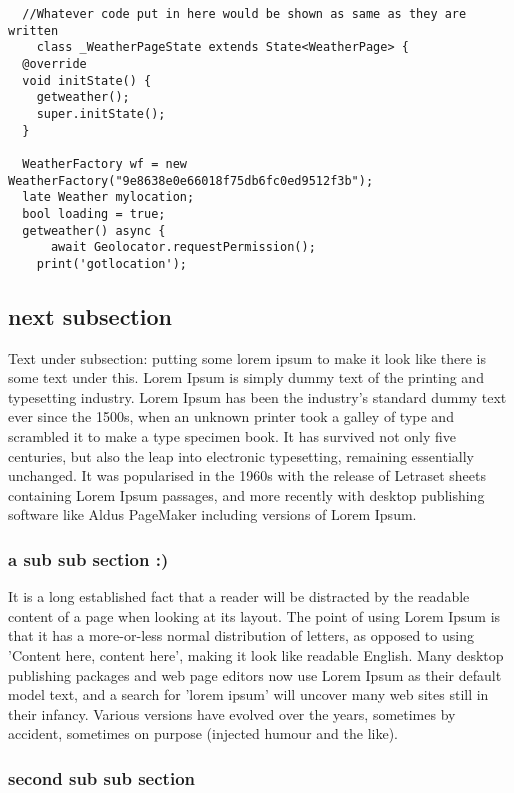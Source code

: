 \documentclass{article}     %
\begin{document}
\begin{verbatim}
  //Whatever code put in here would be shown as same as they are written
    class _WeatherPageState extends State<WeatherPage> {
  @override
  void initState() {
    getweather();
    super.initState();
  }

  WeatherFactory wf = new WeatherFactory("9e8638e0e66018f75db6fc0ed9512f3b");
  late Weather mylocation;
  bool loading = true;
  getweather() async {
      await Geolocator.requestPermission();
    print('gotlocation');
\end{verbatim}



\subsection{next subsection}
Text under subsection:  
putting some lorem ipsum to make it look like there is some text under this. 
Lorem Ipsum is simply dummy text of the printing and typesetting industry. 
Lorem Ipsum has been the industry's standard dummy text ever since the 1500s, 
when an unknown printer took a galley of type and scrambled it to make a type 
specimen book. It has survived not only five centuries, but also the leap into 
electronic typesetting, remaining essentially unchanged. It was popularised in 
the 1960s with the release of Letraset sheets containing Lorem Ipsum passages, 
and more recently with desktop publishing software like Aldus PageMaker 
including versions of Lorem Ipsum.
\subsubsection{a sub sub section :)}

It is a long established fact that a reader will be distracted by the readable 
content of a page when looking at its layout. The point of using Lorem Ipsum is
 that it has a more-or-less normal distribution of letters, as opposed to using 
 'Content here, content here', making it look like readable English. 
 Many desktop publishing packages and web page editors now use Lorem Ipsum as 
 their default model text, and a search for 'lorem ipsum' will uncover many 
 web sites still in their infancy. Various versions have evolved over the years, 
 sometimes by accident, sometimes on purpose (injected humour and the like).
 \subsubsection{second sub sub section}
\end{document}
